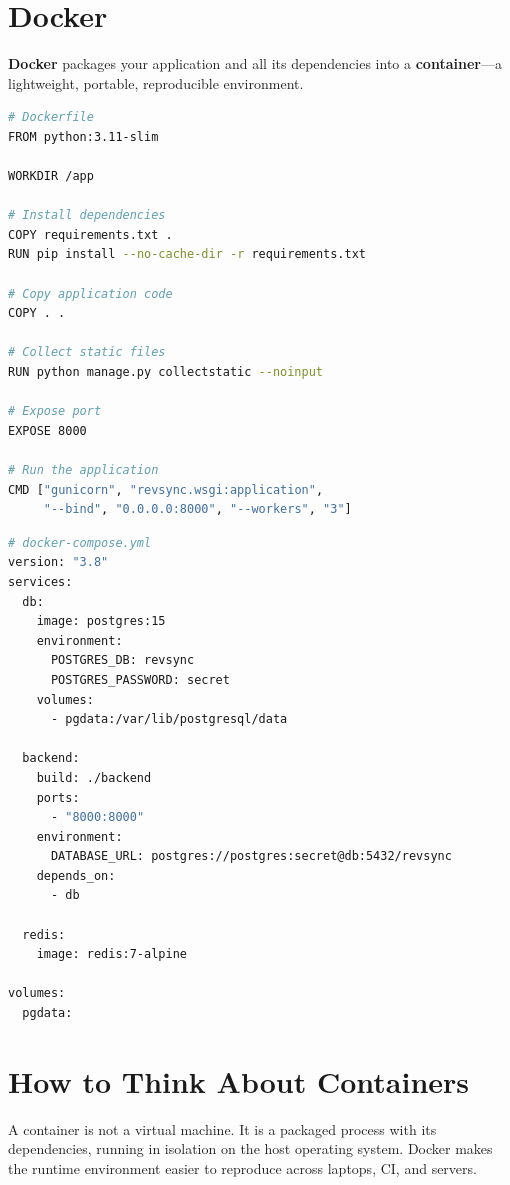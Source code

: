 \documentclass[12pt, a4paper, oneside]{book}
\begin{document}
\section{Docker}

\textbf{Docker} packages your application and all its dependencies into a \textbf{container}---a lightweight, portable, reproducible environment.

\begin{lstlisting}[language=bash, caption={Dockerfile for Django}]
# Dockerfile
FROM python:3.11-slim

WORKDIR /app

# Install dependencies
COPY requirements.txt .
RUN pip install --no-cache-dir -r requirements.txt

# Copy application code
COPY . .

# Collect static files
RUN python manage.py collectstatic --noinput

# Expose port
EXPOSE 8000

# Run the application
CMD ["gunicorn", "revsync.wsgi:application",
     "--bind", "0.0.0.0:8000", "--workers", "3"]
\end{lstlisting}

\begin{lstlisting}[language=bash, caption={Docker Compose for multi-service setup}]
# docker-compose.yml
version: "3.8"
services:
  db:
    image: postgres:15
    environment:
      POSTGRES_DB: revsync
      POSTGRES_PASSWORD: secret
    volumes:
      - pgdata:/var/lib/postgresql/data

  backend:
    build: ./backend
    ports:
      - "8000:8000"
    environment:
      DATABASE_URL: postgres://postgres:secret@db:5432/revsync
    depends_on:
      - db

  redis:
    image: redis:7-alpine

volumes:
  pgdata:
\end{lstlisting}

\section{How to Think About Containers}

\begin{intuitionbox}
A container is not a virtual machine. It is a packaged process with its dependencies, running in isolation on the host operating system. Docker makes the runtime environment easier to reproduce across laptops, CI, and servers.
\end{intuitionbox}
\end{document}
